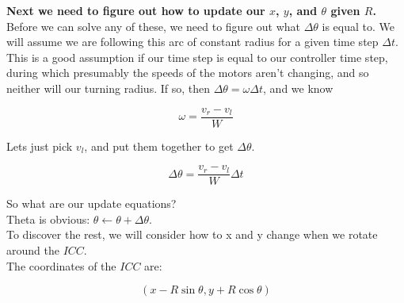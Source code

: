 \documentclass{article}
\begin{document}
\textbf{Next we need to figure out how to update our $x$, $y$, and $\theta$ given $R$.} \\

Before we can solve any of these, we need to figure out what $\Delta\theta$ is equal to. We will assume we are following this arc of constant radius for a given time step $\Delta t$. This is a good assumption if our time step is equal to our controller time step, during which presumably the speeds of the motors aren't changing, and so neither will our turning radius. If so, then $\Delta\theta = \omega\Delta t$, and we know

$$\omega=\frac{v_r - v_l}{W}$$

Lets just pick $v_l$, and put them together to get $\Delta\theta$.

$$\Delta\theta = \frac{v_r - v_l}{W}\Delta t$$

So what are our update equations? \\

Theta is obvious: $\theta \leftarrow \theta+\Delta\theta$. \\

To discover the rest, we will consider how to x and y change when we rotate around the $ICC$. \\

The coordinates of the $ICC$ are:

$$(x-R\sin{\theta}, y+R\cos{\theta})$$
\end{document}
